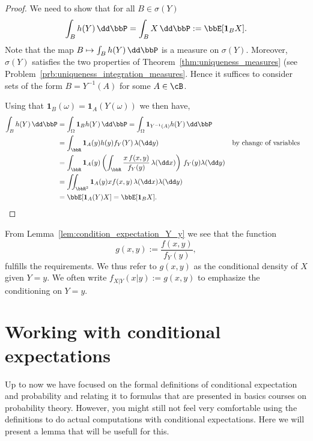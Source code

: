 \begin{proof}
We need to show that for all $B \in \sigma(Y)$
\[
	\int_B h(Y) \, \dd \bbP = \int_B X \, \dd \bbP := \bbE[\mathbf{1}_B X]. 
\]
Note that the map $B \mapsto \int_B h(Y) \, \dd \bbP$ is a measure on $\sigma(Y)$. Moreover, $\sigma(Y)$ satisfies the two properties of Theorem~\ref{thm:uniqueness_measures} (see Problem~\ref{prb:uniqueness_integration_measures}. Hence it suffices to consider sets of the form $B = Y^{-1}(A)$ for some $A \in \cB$. 

Using that $\mathbf{1}_B(\omega) = \mathbf{1}_A(Y(\omega))$ we then have,
\begin{align*}
	\int_B h(Y) \, \dd \bbP &= \int_\Omega \mathbf{1}_{B} h(Y) \, \dd \bbP 
	= \int_\Omega \mathbf{1}_{Y^{-1}(A)} h(Y) \, \dd \bbP \\
	&= \int_\bbR \mathbf{1}_{A}(y) h(y) f_Y(Y) \, \lambda (\dd y) &&\text{by change of variables}\\
	&= \int_\bbR \mathbf{1}_A(y) \left(\int_\bbR \frac{x \, f(x,y)}{f_Y(y)} \, \lambda(\dd x)\right)
		\, f_Y(y) \lambda(\dd y)\\
	&= \iint_{\bbR^2} \mathbf{1}_A(y) x f(x,y) \, \lambda(\dd x) \lambda(\dd y)\\
	&= \bbE[\mathbf{1}_A(Y) X] = \bbE[\mathbf{1}_B X].
\end{align*}
\end{proof}


From Lemma~\ref{lem:condition_expectation_Y_y} we see that the function
\begin{equation}\label{eq:def_condition_pdf}
	g(x,y) := \frac{f(x,y)}{f_Y(y)},
\end{equation}
fulfills the requirements. We thus refer to $g(x,y)$ as the conditional density of $X$ given $Y = y$. We often write $f_{X|Y}(x|y) := g(x,y)$ to emphasize the conditioning on $Y = y$. 



\section{Working with conditional expectations}

Up to now we have focused on the formal definitions of conditional expectation and probability and relating it to formulas that are presented in basics courses on probability theory. However, you might still not feel very comfortable using the definitions to do actual computations with conditional expectations. Here we will present a lemma that will be usefull for this.


